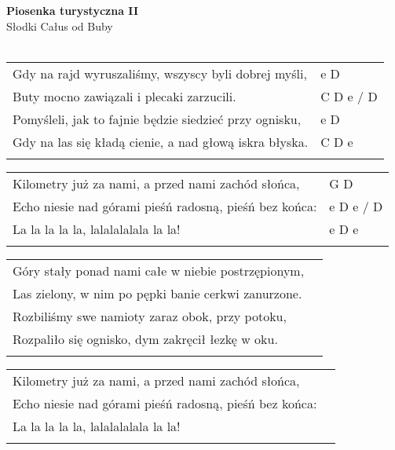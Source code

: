 \documentclass[a5paper]{article}
\begin{document}


\noindent
\fontsize{12pt}{15pt}\selectfont
\textbf{Piosenka turystyczna II} \\
\fontsize{8pt}{10pt}\selectfont
Słodki Całus od Buby \\ \\
\fontsize{10pt}{12pt}\selectfont
{}
\begin{tabular}{@{}p{9.30cm}p{3cm}@{}}
\noindent
Gdy na rajd wyruszaliśmy, wszyscy byli dobrej myśli, & e D \\
Buty mocno zawiązali i plecaki zarzucili. & C D e / D \\
Pomyśleli, jak to fajnie będzie siedzieć przy ognisku, & e D \\
Gdy na las się kładą cienie, a nad głową iskra błyska. & C D e \\ \\
\end{tabular}

\noindent
\begin{tabular}{@{}p{8.30cm}p{3cm}@{}}
Kilometry już za nami, a przed nami zachód słońca, & G D \\
Echo niesie nad górami pieśń radosną, pieśń bez końca: & e D e / D \\
La la la la la, lalalalalala la la! & e D e \\ \\
\end{tabular}

\noindent
\begin{tabular}{@{}p{10.30cm}p{3cm}@{}}
Góry stały ponad nami całe w niebie postrzępionym, \\
Las zielony, w nim po pępki banie cerkwi zanurzone. \\
Rozbiliśmy swe namioty zaraz obok, przy potoku, \\
Rozpaliło się ognisko, dym zakręcił łezkę w oku. \\ \\
\end{tabular}

\noindent
\begin{tabular}{@{}p{10.30cm}p{3cm}@{}}
Kilometry już za nami, a przed nami zachód słońca, \\
Echo niesie nad górami pieśń radosną, pieśń bez końca: \\
La la la la la, lalalalalala la la! \\ \\
\end{tabular}
\end{document}
